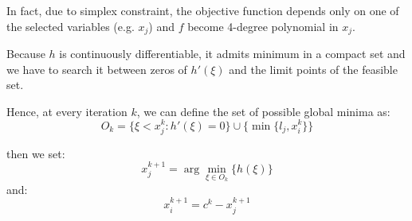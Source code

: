 In fact, due to simplex constraint, the objective function depends only on one of the selected variables (e.g. $x_j$) and $f$ become 4-degree polynomial in $x_j$.

Because $h$ is continuously differentiable, it admits minimum in a compact set and we have to search it between zeros of $h'(\xi)$ and the limit points of the feasible set.

Hence, at every iteration $k$, we can define the set of possible global minima as:
\begin{equation}
 O_k = \{ \xi < x_j^k: h'(\xi)=0\} \cup \{\min\{l_j,x_i^k\} \}
\end{equation}

then we set:
\begin{equation}
x_j^{k+1}= \arg \min_{\xi \in O_k} \{h(\xi)\}
\end{equation}
and:
\begin{equation}
x_i^{k+1}= c^{k}-x^{k+1}_j
\end{equation}



